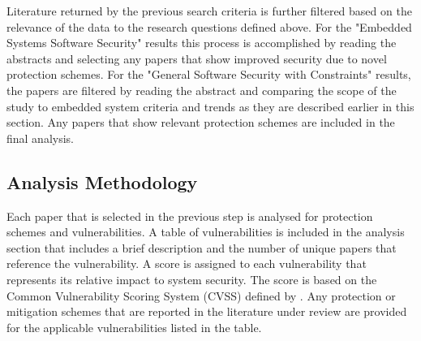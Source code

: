 \documentclass[final,conference,10pt]{IEEEtran}
\begin{document}
Literature returned by the previous search criteria is further filtered based on the relevance of the data to the research questions defined above.  For the "Embedded Systems Software Security" results this process is accomplished by reading the abstracts and selecting any papers that show improved security due to novel protection schemes. For the "General Software Security with Constraints" results, the papers are filtered by reading the abstract and comparing the scope of the study to embedded system criteria and trends as they are described earlier in this section. Any papers that show relevant protection schemes are included in the final analysis.

\subsection{Analysis Methodology}

Each paper that is selected in the previous step is analysed for protection schemes and vulnerabilities.  A table of vulnerabilities is included in the analysis section that includes a brief description and the number of unique papers that reference the vulnerability. A score is assigned to each vulnerability that represents its relative impact to system security. The score is based on the Common Vulnerability Scoring System (CVSS) defined by .  Any protection or mitigation schemes that are reported in the literature under review are provided for the applicable vulnerabilities listed in the table.  


\end{document}

